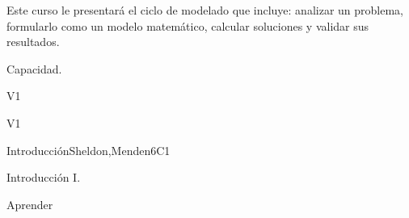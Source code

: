
\begin{syllabus}


\begin{justification}
Este curso le presentará el ciclo de modelado que incluye: analizar un problema, formularlo como un modelo matemático, calcular soluciones y validar sus resultados. 
\end{justification}

\begin{goals}
\item Capacidad.
\end{goals}

\begin{outcomes}{V1}
   \item {}
\end{outcomes}

\begin{competences}{V1}
    \item {} 
\end{competences}


\begin{unit}{Introducción}{}{Sheldon,Menden}{6}{C1}
\begin{topics}
      \item Introducción I.
   \end{topics}

   \begin{learningoutcomes}
      \item Aprender
   \end{learningoutcomes}
\end{unit}






\begin{coursebibliography}
\end{coursebibliography}

\end{syllabus}
